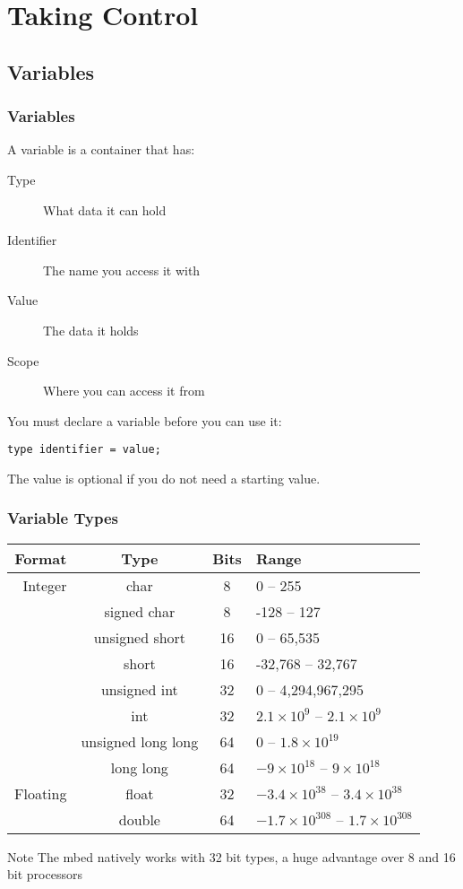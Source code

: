 \section{Taking Control}
\label{sec:taking_control}

\subsection{Variables}
\label{sub:variables}
\begin{frame}[fragile]
	\frametitle{Variables}
	A variable is a container that has:
	\begin{description}
		\item [Type] What data it can hold
		\item [Identifier] The name you access it with
		\item [Value] The data it holds
		\item [Scope] Where you can access it from
	\end{description}
	\vfill
	You must declare a variable before you can use it:
	\begin{lstlisting}[numbers=none]
		type identifier = value;
	\end{lstlisting}
	The value is optional if you do not need a starting value.
\end{frame}

\begin{frame}
	\frametitle{Variable Types}
	\begin{tabular}{r|c|c|l}
		Format & Type & Bits & Range\\
		\hline
		Integer & char & 8 & 0 -- 255\\
		& signed char & 8 & -128 -- 127\\
		& unsigned short & 16 & 0 -- 65,535\\
		& short & 16 & -32,768 -- 32,767\\
		& unsigned int & 32 & 0 -- 4,294,967,295\\
		& int & 32 & $2.1 \times 10^9$ -- $2.1 \times 10^9$\\
		& unsigned long long & 64 & 0 -- $1.8 \times 10^{19}$\\
		& long long & 64 & $-9 \times 10^{18}$ -- $9 \times 10^{18}$\\
		\hline
		Floating & float & 32 & $-3.4 \times 10^{38}$ -- $3.4 \times 10^{38}$\\
		& double & 64 & $-1.7 \times 10^{308}$ -- $1.7 \times 10^{308}$\\
	\end{tabular}
	\begin{block}{Note}
		The mbed natively works with 32 bit types, a huge advantage over 8 and 16 bit processors
	\end{block}
\end{frame}


